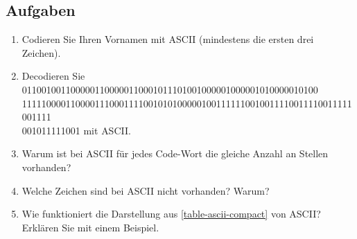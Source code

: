 \clearpage

\subsection{Aufgaben}
\label{subsection-ascii-aufgaben}

\begin{enumerate}
\item Codieren Sie Ihren Vornamen mit \ac{ASCII} (mindestens die ersten drei Zeichen).

\fillwithgrid{0.75in}

\item Decodieren Sie 0110010011000001100000110001011101001000001000001010000010100\\11111000011000011100011110010101000001001111110010011110011110011111001111\\001011111001 mit \ac{ASCII}.

\fillwithgrid{0.25in}

\item Warum ist bei \ac{ASCII} für jedes Code-Wort die gleiche Anzahl an Stellen vorhanden?

\fillwithgrid{0.75in}

\item Welche Zeichen sind bei \ac{ASCII} nicht vorhanden? Warum?

\fillwithgrid{0.75in}

\item Wie funktioniert die Darstellung aus \autoref{table-ascii-compact} von \ac{ASCII}? Erklären Sie mit einem Beispiel.

\fillwithgrid{0.75in}

\end{enumerate}


